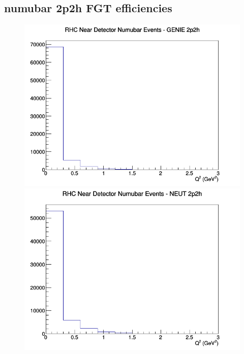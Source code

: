 \documentclass[12pt]{article}
\begin{document}
\subsection{numubar 2p2h FGT efficiencies}
\begin{figure}[h]
\includegraphics[width=\linewidth]{eff_Q2/FGT/2p2h_RHC_ND_numubar_Q2_GENIE.png}
\endminipage
{}
\includegraphics[width=\linewidth]{eff_Q2/FGT/2p2h_RHC_ND_numubar_Q2_NEUT.png}
\endminipage
{}

\end{figure}
\end{document}
